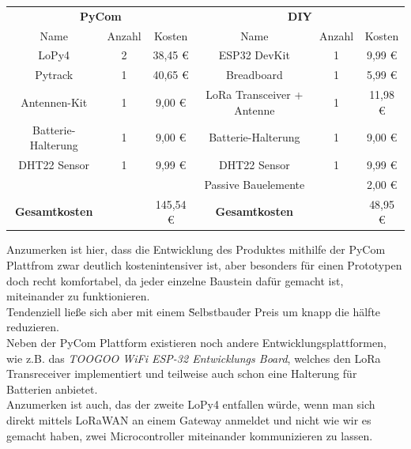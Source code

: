 \begin{adjustwidth}{-1in}{-1in}%
	\begin{center}

	        \begin{tabular}{cccccc}
			\toprule
			\multicolumn{3}{c}{\textbf{PyCom}} & \multicolumn{3}{c}{\textbf{DIY}}\\

			Name & Anzahl & Kosten & Name & Anzahl & Kosten\\

			\midrule
			LoPy4 & 2 & 38,45 € & ESP32 DevKit & 1 & 9,99 €\\
			Pytrack  & 1 & 40,65 € & Breadboard & 1 & 5,99 €\\
			Antennen-Kit  & 1 & 9,00 € & LoRa Transceiver + Antenne & 1 & 11,98 €\\
			Batterie-Halterung & 1 & 9,00 € & Batterie-Halterung & 1 & 9,00 € \\
			DHT22 Sensor & 1 & 9,99 € & DHT22 Sensor & 1 & 9,99 €\\
			 &  &  & Passive Bauelemente &  & 2,00 €\\

			\midrule
			\textbf{Gesamtkosten} & & 145,54 € & \textbf{Gesamtkosten} & & 48,95 €\\

			\bottomrule

	        \end{tabular}
		\label{}
		 \label{tab:kostenaustellung} 
	\end{center}
\end{adjustwidth}

Anzumerken ist hier, dass die Entwicklung des Produktes mithilfe der PyCom Plattfrom zwar deutlich kostenintensiver ist, aber besonders für einen Prototypen doch recht komfortabel, da jeder einzelne Baustein dafür gemacht ist, miteinander zu funktionieren.\\
Tendenziell ließe sich aber mit einem \"Selbstbau\" der Preis um knapp die hälfte reduzieren.\\
Neben der PyCom Plattform existieren noch andere Entwicklungsplattformen, wie z.B. das \textit{TOOGOO WiFi ESP-32 Entwicklungs Board}, welches den LoRa Transreceiver implementiert und teilweise auch schon eine Halterung für Batterien anbietet.\\
Anzumerken ist auch, das der zweite LoPy4 entfallen würde, wenn man sich direkt mittels LoRaWAN an einem Gateway anmeldet und nicht wie wir es gemacht haben, zwei Microcontroller miteinander kommunizieren zu lassen.\\

